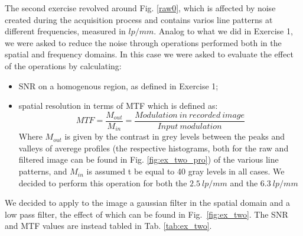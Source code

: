\documentclass[a4paper]{article}
\begin{document}
The second exercise revolved around Fig. \ref{raw0}, which is affected by noise created during the acquisition process and contains varios line patterns at different frequencies, measured in $lp/ mm$. Analog to what we did in Exercise 1, we were asked to reduce the noise through operations performed both in the spatial and frequency domains. In this case we were asked to evaluate the effect of the operations by calculating:
\begin{itemize}
\item SNR on a homogenous region, as defined in Exercise 1;
\item spatial resolution in terms of MTF which is defined as:
\begin{equation}
MTF=\frac{M_{out}}{M_{in}}=\frac{Modulation\ in\ recorded\ image}{Input\ modulation}
\end{equation}
Where $M_{out}$ is given by the contrast in grey levels between the peaks and valleys of averege profiles (the respective histograms, both for the raw and filtered image can be found in Fig. \ref{fig:ex_two_pro}) of the various line patterns, and $M_{in}$ is assumed t be equal to 40 gray levels in all cases. We decided to perform this operation for both the $2.5\ lp/mm$ and the
$6.3\ lp/mm$
\end{itemize}
We decided to apply to the image a gaussian filter in the spatial domain and a low pass filter, the effect of which can be found in Fig.~\ref{fig:ex_two}. The SNR and MTF values are instead tabled in Tab. \ref{tab:ex_two}.

\clearpage


\clearpage
\end{document}
